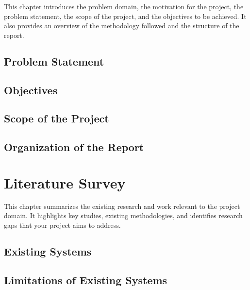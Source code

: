 \documentclass[12pt]{report}
\begin{document}

This chapter introduces the problem domain, the motivation for the project, the problem statement, the scope of the project, and the objectives to be achieved. It also provides an overview of the methodology followed and the structure of the report.

\section{Problem Statement}

\section{Objectives}

\section{Scope of the Project}

\section{Organization of the Report}

\newpage

\chapter{Literature Survey}


This chapter summarizes the existing research and work relevant to the project domain. It highlights key studies, existing methodologies, and identifies research gaps that your project aims to address.

\section{Existing Systems}

\section{Limitations of Existing Systems}
\end{document}
